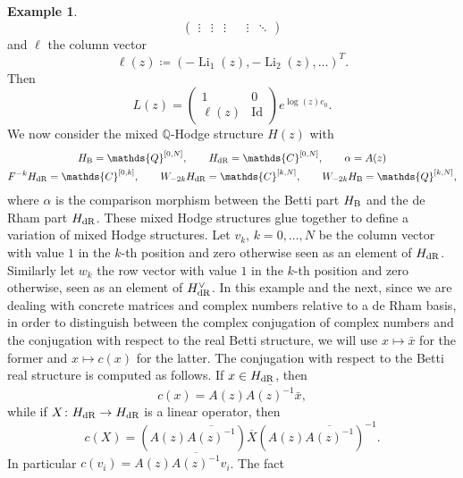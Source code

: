 \documentclass[11pt,a4paper]{amsart}
\newcommand{\Betti}{\text{\rm B}}
\newcommand{\dR}{\text{\rm dR}}
\newcommand{\C}{\mathds{C}}
\newcommand{\Q}{\mathds{Q}}
\DeclareMathOperator{\Id}{Id}
\DeclareMathOperator{\Li}{Li}
\numberwithin{equation}{section}
\theoremstyle{plain}
\theoremstyle{definition}
\newtheorem{ex}[prop]{Example}
\begin{document}
\begin{ex}
\begin{displaymath}
\begin{pmatrix}
      \vdots & \vdots  & \vdots & & \vdots &\ddots
    \end{pmatrix}
  \end{displaymath}
  and $\ell$ the column vector
  \begin{displaymath}
    \ell(z) \coloneqq ( -\Li_{1}(z),-\Li_{2}(z),\dots)^{T}.
  \end{displaymath}
  Then
  \begin{displaymath}
    L(z) =
    \begin{pmatrix}
      1 & 0\\
      \ell(z) & \Id
    \end{pmatrix}e^{\log (z) e_{0}}.
  \end{displaymath}
  We now consider the
  mixed $\Q$-Hodge
  structure $H(z)$ with
  \begin{gather*}
    H_{\Betti}=\Q^{[0,N]},\qquad H_{\dR}=\C^{[0,N]},\qquad \alpha =A(z)\\
    F^{-k}H_{\dR}= \C^{[0,k]},\qquad W_{-2k}H_{\dR}= \C^{[k,N]}
    ,\qquad W_{-2k}H_{\Betti}= \Q^{[k,N]},
  \end{gather*}
  where $\alpha $ is the comparison morphism between the Betti part
  $H_{\Betti}$ and the de Rham part $H_{\dR}$. These mixed Hodge structures
  glue together to define a variation of mixed Hodge structures. 
  Let $v_{k}$, $k=0,\dots,N$
  be the column vector with value $1$ in the $k$-th position and zero
  otherwise seen as an element of $H_\dR$. Similarly let $w_{k}$ the
  row vector with value $1$ in the $k$-th position and zero
  otherwise, seen as an element of $H_\dR^{\vee}$. 
  In this example and the next, since we are dealing with concrete
  matrices and complex numbers relative to a de Rham basis, in order
  to distinguish between the complex conjugation of complex numbers
  and the conjugation 
  with respect to the real Betti structure, we will use $x\mapsto \bar
  x$ for the former and $x\mapsto c(x)$ for the latter. 
  The  conjugation with respect to the Betti real structure is
  computed as follows. If $x\in H_{\dR}$, then
  \begin{displaymath}
    c(x)= A(z) \overline {A(z)^{-1}}\bar x, 
  \end{displaymath}
  while if $X\colon H_{\dR}\to H_{\dR}$ is a linear operator, then
  \begin{equation}\label{eq:31}
    c(X)=(A(z)\overline{A(z)^{-1}} )\overline X
    (A(z)\overline{A(z)^{-1}})^{-1}. 
  \end{equation}
  In particular $c(v_{i})=A(z)\overline{A(z)^{-1}} v_{i}$. The fact

\end{ex}
\end{document}
